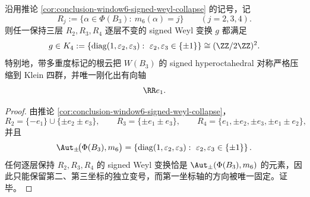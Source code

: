 \begin{corollary}\label{cor:derived-window6-multiplicity-rootcloud-signed-weyl-collapse}
沿用推论 \ref{cor:conclusion-window6-signed-weyl-collapse} 的记号，记
\[
R_j:=\{\alpha\in \Phi(B_3):\ m_6(\alpha)=j\}
\qquad (j=2,3,4).
\]
则任一保持三层 \(R_2,R_3,R_4\) 逐层不变的 signed Weyl 变换 \(g\) 都满足
\[
g\in
K_4:=
\left\{
\operatorname{diag}(1,\varepsilon_2,\varepsilon_3):\
\varepsilon_2,\varepsilon_3\in\{\pm 1\}
\right\}
\cong (\ZZ/2\ZZ)^2.
\]
特别地，带多重度标记的根云把 \(W(B_3)\) 的 signed hyperoctahedral 对称严格压缩到 Klein 四群，并唯一刚化出有向轴
\[
\RR e_1.
\]
\end{corollary}
\begin{proof}
由推论 \ref{cor:conclusion-window6-signed-weyl-collapse}，
\[
R_2=\{-e_1\}\cup\{\pm e_2\pm e_3\},
\qquad
R_3=\{\pm e_1\pm e_3\},
\qquad
R_4=\{e_1,\pm e_2,\pm e_3,\pm e_1\pm e_2\},
\]
并且
\[
\Aut_{\pm}\!\bigl(\Phi(B_3),m_6\bigr)
=
\left\{
\operatorname{diag}(1,\varepsilon_2,\varepsilon_3):\ \varepsilon_2,\varepsilon_3\in\{\pm1\}
\right\}.
\]
任何逐层保持 \(R_2,R_3,R_4\) 的 signed Weyl 变换恰是 \(\Aut_{\pm}(\Phi(B_3),m_6)\) 的元素，因此只能保留第二、第三坐标的独立变号，而第一坐标轴的方向被唯一固定。证毕。
\end{proof}
